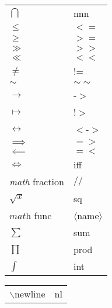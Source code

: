 \documentclass[10pt]{beamer}
\begin{document}

\begin{frame}

\begin{tabular}{ll}
$\bigcap$ & nnn \\
$\le$ & $<=$ \\
$\ge$ & $>=$ \\
$\gg$ & $>>$ \\
$\ll$ & $<<$ \\
$\neq$ & != \\
$\sim$ & $\sim\sim$ \\
$\to$ & -$>$ \\
$\mapsto$ & !$>$ \\
$\leftrightarrow$ & $<$-$>$ \\
$\implies$ & $=>$ \\
$\impliedby$ & $=<$ \\
$\iff$ & iff \\
\textit{math} fraction & $//$ \\
$\sqrt{x}$ & sq \\
$\textit{math}$ func & $\langle$name$\rangle$ \\
$\sum$ & sum \\
$\prod$ & prod \\
$\int$ & int
\end{tabular}
\hspace*{1ex}
\vrule
\begin{tabular}{ll}
$\backslash$newline & nl \\
\end{tabular}

\end{frame}

\end{document}
